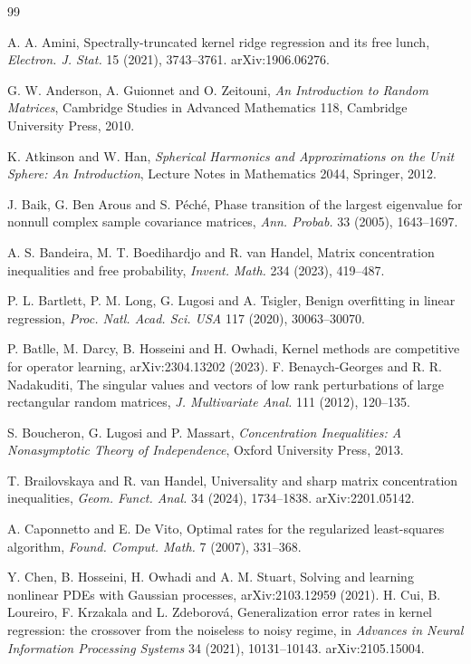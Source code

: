 \documentclass[11pt]{article}
\theoremstyle{definition}
\begin{document}
\begin{thebibliography}{99}

 A. A. Amini, Spectrally-truncated kernel ridge regression and its free lunch,
\emph{Electron. J. Stat.} 15 (2021), 3743--3761. arXiv:1906.06276.

 G. W. Anderson, A. Guionnet and O. Zeitouni, \emph{An Introduction to Random
Matrices}, Cambridge Studies in Advanced Mathematics 118, Cambridge University Press, 2010.

 K. Atkinson and W. Han, \emph{Spherical Harmonics and Approximations on the
Unit Sphere: An Introduction}, Lecture Notes in Mathematics 2044, Springer, 2012.

 J. Baik, G. Ben Arous and S. P\'ech\'e, Phase transition of the largest eigenvalue
for nonnull complex sample covariance matrices, \emph{Ann. Probab.} 33 (2005), 1643--1697.

 A. S. Bandeira, M. T. Boedihardjo and R. van Handel, Matrix concentration
inequalities and free probability, \emph{Invent. Math.} 234 (2023), 419--487.

 P. L. Bartlett, P. M. Long, G. Lugosi and A. Tsigler, Benign overfitting in
linear regression, \emph{Proc. Natl. Acad. Sci. USA} 117 (2020), 30063--30070.


 P. Batlle, M. Darcy, B. Hosseini and H. Owhadi, Kernel methods are competitive for operator learning, arXiv:2304.13202 (2023).
 F. Benaych-Georges and R. R. Nadakuditi, The singular values and vectors of low rank
perturbations of large rectangular random matrices, \emph{J. Multivariate Anal.} 111 (2012),
120--135.

 S. Boucheron, G. Lugosi and P. Massart, \emph{Concentration Inequalities: A
Nonasymptotic Theory of Independence}, Oxford University Press, 2013.

 T. Brailovskaya and R. van Handel, Universality and sharp matrix concentration
inequalities, \emph{Geom. Funct. Anal.} 34 (2024), 1734--1838. arXiv:2201.05142.

 A. Caponnetto and E. De Vito, Optimal rates for the regularized
least-squares algorithm, \emph{Found. Comput. Math.} 7 (2007), 331--368.


 Y. Chen, B. Hosseini, H. Owhadi and A. M. Stuart, Solving and learning nonlinear PDEs with Gaussian processes, arXiv:2103.12959 (2021).
 H. Cui, B. Loureiro, F. Krzakala and L. Zdeborov\'a, Generalization error rates in
kernel regression: the crossover from the noiseless to noisy regime, in \emph{Advances in Neural
Information Processing Systems} 34 (2021), 10131--10143. arXiv:2105.15004.


\end{thebibliography}
\end{document}
